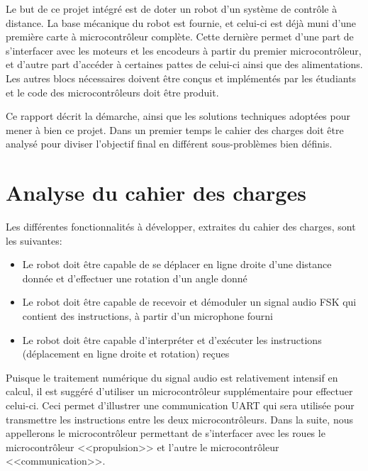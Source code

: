 Le but de ce projet intégré est de doter un robot d'un système de contrôle à distance. La base mécanique du robot est fournie, et celui-ci est déjà muni d'une première carte à microcontrôleur complète. Cette dernière permet d'une part de s'interfacer avec les moteurs et les encodeurs à partir du premier microcontrôleur, et d'autre part d'accéder à certaines pattes de celui-ci ainsi que des alimentations. Les autres blocs nécessaires doivent être conçus et implémentés par les étudiants et le code des microcontrôleurs doit être produit.

Ce rapport décrit la démarche, ainsi que les solutions techniques adoptées pour mener à bien ce projet. Dans un premier temps le cahier des charges doit être analysé pour diviser l'objectif final en différent sous-problèmes bien définis.

\section{Analyse du cahier des charges}
Les différentes fonctionnalités à développer, extraites du cahier des charges, sont les suivantes:
\begin{itemize}
  \item Le robot doit être capable de se déplacer en ligne droite d'une distance donnée et d'effectuer une rotation d'un angle donné
  \item Le robot doit être capable de recevoir et démoduler un signal audio FSK qui contient des instructions, à partir d'un microphone fourni
  \item Le robot doit être capable d’interpréter et d'exécuter les instructions (déplacement en ligne droite et rotation) reçues
\end{itemize}

Puisque le traitement numérique du signal audio est relativement intensif en calcul, il est suggéré d'utiliser un microcontrôleur supplémentaire pour effectuer celui-ci. Ceci permet d'illustrer une communication UART qui sera utilisée pour transmettre les instructions entre les deux microcontrôleurs. Dans la suite, nous appellerons le microcontrôleur permettant de s'interfacer avec les roues le microcontrôleur <<propulsion>> et l'autre le microcontrôleur <<communication>>.

